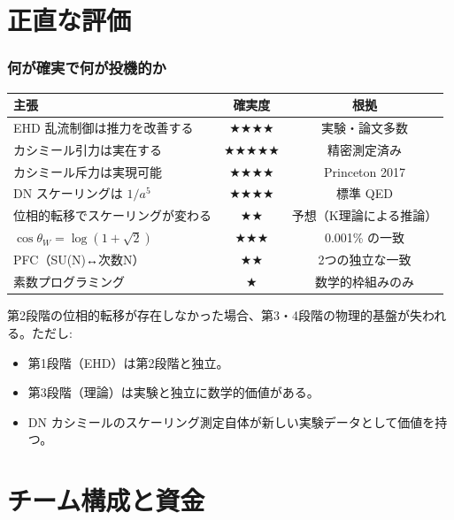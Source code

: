 \documentclass[11pt,a4paper]{article}
\begin{document}
\part{正直な評価}

\section{何が確実で何が投機的か}

\begin{center}
\renewcommand{\arraystretch}{1.3}
\begin{tabular}{lcc}
\toprule
主張 & 確実度 & 根拠 \\
\midrule
EHD 乱流制御は推力を改善する & ★★★★ & 実験・論文多数 \\
カシミール引力は実在する & ★★★★★ & 精密測定済み \\
カシミール斥力は実現可能 & ★★★★ & Princeton 2017 \\
DN スケーリングは $1/a^5$ & ★★★★ & 標準 QED \\
位相的転移でスケーリングが変わる & ★★ & 予想（K理論による推論） \\
$\cos\theta_W = \log(1+\sqrt{2})$ & ★★★ & 0.001\% の一致 \\
PFC（SU(N)↔次数N） & ★★ & 2つの独立な一致 \\
素数プログラミング & ★ & 数学的枠組みのみ \\
\bottomrule
\end{tabular}
\end{center}

\begin{honestbox}[最大のリスク]
第2段階の位相的転移が存在しなかった場合、第3・4段階の物理的基盤が失われる。ただし:
\begin{itemize}
\item 第1段階（EHD）は第2段階と独立。
\item 第3段階（理論）は実験と独立に数学的価値がある。
\item DN カシミールのスケーリング測定自体が新しい実験データとして価値を持つ。
\end{itemize}
\end{honestbox}

\part{チーム構成と資金}
\end{document}

